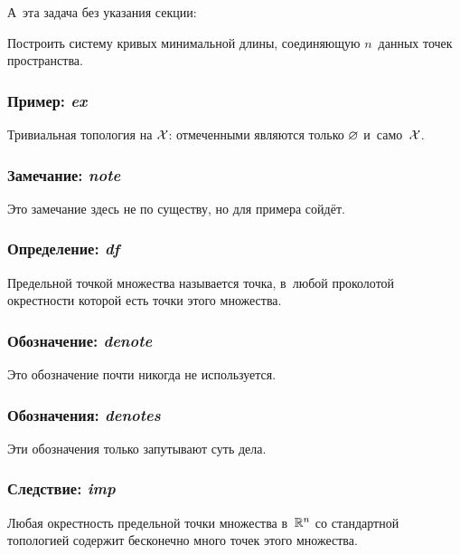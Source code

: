 \documentclass[a4paper]{article}
\begin{document}
А~эта задача без указания секции:

\begin{tproblem}[Штейнер] Построить систему кривых минимальной длины, соединяющую $n$~данных точек пространства.
\end{tproblem}


\subsubsection{Пример: \emph{ex}}
\begin{ex}
Тривиальная топология на $\mathcal{X}$: отмеченными являются только $\varnothing$ и~само~$\mathcal{X}$.
\end{ex}

\subsubsection{Замечание: \emph{note}}
\begin{note}
Это замечание здесь не по существу, но для примера сойдёт.
\end{note}

\subsubsection{Определение: \emph{df}}
\begin{df}
Предельной точкой множества называется точка, в~любой проколотой окрестности которой есть точки этого множества.
\end{df}

\subsubsection{Обозначение: \emph{denote}}
\begin{denote}
Это обозначение почти никогда не используется.
\end{denote}

\subsubsection{Обозначения: \emph{denotes}}
\begin{denotes}
Эти обозначения только запутывают суть дела.
\end{denotes}

\subsubsection{Следствие: \emph{imp}}
\begin{imp}
Любая окрестность предельной точки множества в~$\mathbb{R}^n$ со стандартной топологией содержит бесконечно много
точек этого множества.
\end{imp}
\end{document}
